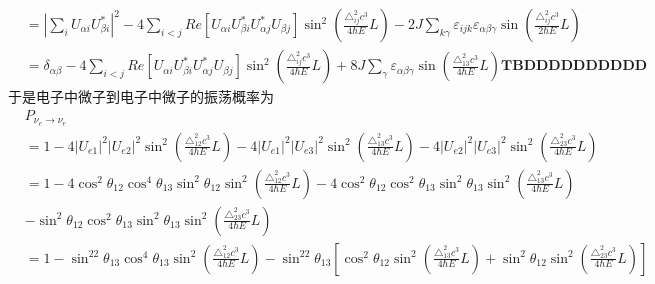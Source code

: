 \begin{GCBox}[title = 三味混合]{}
\begin{equation}
\begin{aligned}
							&= \left|\sum_i U_{\alpha i}U^*_{\beta i}\right|^2 - 4\sum_{i < j}Re[U_{\alpha i}U^*_{\beta i}U^*_{\alpha j}U_{\beta j}]\sin^2\left(\frac{\triangle_{ij}^2c^3}{4\hbar E}L\right) - 2J\sum_{k\gamma}\varepsilon_{ijk}\varepsilon_{\alpha\beta\gamma}\sin\left(\frac{\triangle_{ij}^2c^3}{2\hbar E}L\right)\\
							&= \delta_{\alpha\beta} - 4\sum_{i < j}Re[U_{\alpha i}U^*_{\beta i}U^*_{\alpha j}U_{\beta j}]\sin^2\left(\frac{\triangle_{ij}^2c^3}{4\hbar E}L\right) + 8J\sum_\gamma \varepsilon_{\alpha\beta\gamma}\sin\left(\frac{\triangle_{13}^2c^3}{4\hbar E}L\right)\textbf{TBDDDDDDDDDD}
						\end{aligned}
					\end{equation}
				于是电子中微子到电子中微子的振荡概率为
					\begin{equation}
						\begin{aligned}
							&P_{\nu_e \rightarrow \nu_e}\\
							&= 1 - 4|U_{e1}|^2|U_{e2}|^2\sin^2\left(\frac{\triangle_{12}^2c^3}{4\hbar E}L\right)
							- 4|U_{e1}|^2|U_{e3}|^2\sin^2\left(\frac{\triangle_{13}^2c^3}{4\hbar E}L\right)
							- 4|U_{e2}|^2|U_{e3}|^2\sin^2\left(\frac{\triangle_{23}^2c^3}{4\hbar E}L\right)\\
							&= 1 - 4\cos^2\theta_{12}\cos^4\theta_{13}\sin^2\theta_{12}\sin^2\left(\frac{\triangle_{12}^2c^3}{4\hbar E}L\right) - 4\cos^2\theta_{12}\cos^2\theta_{13}\sin^2\theta_{13}\sin^2\left(\frac{\triangle_{13}^2c^3}{4\hbar E}L\right)\\
							& - \sin^2\theta_{12}\cos^2\theta_{13}\sin^2\theta_{13}\sin^2\left(\frac{\triangle_{23}^2c^3}{4\hbar E}L\right)\\
							&= 1 - \sin^22\theta_{13}\cos^4\theta_{13}\sin^2\left(\frac{\triangle_{12}^2c^3}{4\hbar E}L\right) - \sin^22\theta_{13}\left[\cos^2\theta_{12}\sin^2\left(\frac{\triangle_{13}^2c^3}{4\hbar E}L\right) + \sin^2\theta_{12}\sin^2\left(\frac{\triangle_{23}^2c^3}{4\hbar E}L\right)\right] 
						\end{aligned}
					\end{equation}
			\end{GCBox}
